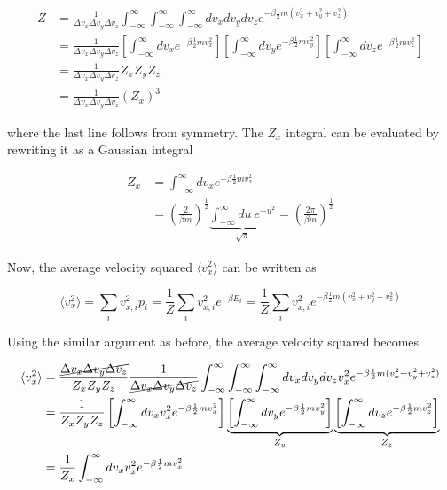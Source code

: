 \begin{align*}
	Z&=\frac{1}{\Delta v_x \Delta v_y \Delta v_z}\int_{-\infty}^\infty\int_{-\infty}^\infty\int_{-\infty}^\infty dv_xdv_ydv_z e^{-\beta \frac{1}{2}m (v_x^2+v_y^2+v_z^2)} \\
	&=\frac{1}{\Delta v_x \Delta v_y \Delta v_z}\left[ \int_{-\infty}^\infty dv_x e^{-\beta \frac{1}{2}m v_x^2} \right]\left[ \int_{-\infty}^\infty dv_y e^{-\beta \frac{1}{2}m v_y^2} \right]\left[ \int_{-\infty}^\infty dv_z e^{-\beta \frac{1}{2}m v_z^2} \right] \\
	&=\frac{1}{\Delta v_x \Delta v_y \Delta v_z}Z_xZ_yZ_z \\
	&=\frac{1}{\Delta v_x \Delta v_y \Delta v_z}(Z_x)^3
\end{align*}

where the last line follows from symmetry. The $Z_x$ integral can be evaluated by rewriting it as a Gaussian integral

\begin{align*}
	Z_x&=\int_{-\infty}^\infty dv_x e^{-\beta \frac{1}{2}m v_x^2} \\
	&=\left( \frac{2}{\beta m} \right)^{\frac12} \underbrace{\int_{-\infty}^\infty du \: e^{-u^2}}_{\sqrt{\pi}}  = \left( \frac{2\pi}{\beta m} \right)^{\frac12}
\end{align*}

Now, the average velocity squared $\langle v_x^2 \rangle$ can be written as

$$\langle v_x^2 \rangle = \sum_i v_{x,i}^2 p_i = \frac{1}{Z}\sum_i v_{x,i}^2 e^{-\beta E_i} = \frac{1}{Z}\sum_i v_{x,i}^2 e^{-\beta \frac{1}{2}m (v_x^2+v_y^2+v_z^2)}$$

Using the similar argument as before, the average velocity squared becomes

\begin{align*}
	\langle v_x^2 \rangle &= \frac{\cancel{\Delta v_x \Delta v_y \Delta v_z}}{Z_xZ_yZ_z} \frac{1}{\cancel{\Delta v_x \Delta v_y \Delta v_z}} \int_{-\infty}^\infty\int_{-\infty}^\infty\int_{-\infty}^\infty dv_xdv_ydv_z v_x^2 e^{-\beta \frac{1}{2}m (v_x^2+v_y^2+v_z^2)} \\
	&= \frac{1}{Z_xZ_yZ_z}\left[ \int_{-\infty}^\infty dv_x v_x^2 e^{-\beta \frac{1}{2}m v_x^2} \right]\underbrace{\left[ \int_{-\infty}^\infty dv_y e^{-\beta \frac{1}{2}m v_y^2} \right]}_{Z_y} \underbrace{\left[ \int_{-\infty}^\infty dv_z e^{-\beta \frac{1}{2}m v_z^2} \right]}_{Z_z} \\
	&= \frac{1}{Z_x} \int_{-\infty}^\infty dv_x v_x^2 e^{-\beta \frac{1}{2}m v_x^2}
\end{align*}

